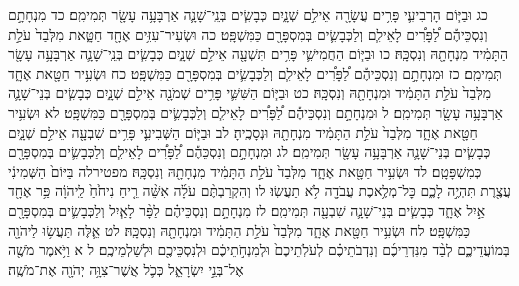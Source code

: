 \documentclass[twoside, openany, parskip=half, 11pt]{book}
\begin{document}
כג וּבַיּ֧וֹם הָרְבִיעִ֛י פָּרִ֥ים עֲשָׂרָ֖ה אֵילִ֣ם שְׁנָ֑יִם כְּבָשִׂ֧ים בְּנֵֽי־שָׁנָ֛ה אַרְבָּעָ֥ה עָשָׂ֖ר תְּמִימִֽם׃ כד מִנְחָתָ֣ם וְנִסְכֵּיהֶ֡ם לַ֠פָּרִ֠ים לָאֵילִ֧ם וְלַכְּבָשִׂ֛ים בְּמִסְפָּרָ֖ם כַּמִּשְׁפָּֽט׃ כה וּשְׂעִיר־עִזִּ֥ים אֶחָ֖ד חַטָּ֑את מִלְּבַד֙ עֹלַ֣ת הַתָּמִ֔יד מִנְחָתָ֖הּ וְנִסְכָּֽהּ׃
כו וּבַיּ֧וֹם הַחֲמִישִׁ֛י פָּרִ֥ים תִּשְׁעָ֖ה אֵילִ֣ם שְׁנָ֑יִם כְּבָשִׂ֧ים בְּנֵֽי־שָׁנָ֛ה אַרְבָּעָ֥ה עָשָׂ֖ר תְּמִימִֽם׃ כז וּמִנְחָתָ֣ם וְנִסְכֵּיהֶ֡ם לַ֠פָּרִ֠ים לָאֵילִ֧ם וְלַכְּבָשִׂ֛ים בְּמִסְפָּרָ֖ם כַּמִּשְׁפָּֽט׃ כח וּשְׂעִ֥יר חַטָּ֖את אֶחָ֑ד מִלְּבַד֙ עֹלַ֣ת הַתָּמִ֔יד וּמִנְחָתָ֖הּ וְנִסְכָּֽהּ׃
כט וּבַיּ֧וֹם הַשִּׁשִּׁ֛י פָּרִ֥ים שְׁמֹנָ֖ה אֵילִ֣ם שְׁנָ֑יִם כְּבָשִׂ֧ים בְּנֵי־שָׁנָ֛ה אַרְבָּעָ֥ה עָשָׂ֖ר תְּמִימִֽם׃ ל וּמִנְחָתָ֣ם וְנִסְכֵּיהֶ֡ם לַ֠פָּרִ֠ים לָאֵילִ֧ם וְלַכְּבָשִׂ֛ים בְּמִסְפָּרָ֖ם כַּמִּשְׁפָּֽט׃ לא וּשְׂעִ֥יר חַטָּ֖את אֶחָ֑ד מִלְּבַד֙ עֹלַ֣ת הַתָּמִ֔יד מִנְחָתָ֖הּ וּנְסָכֶֽיהָ׃
לב וּבַיּ֧וֹם הַשְּׁבִיעִ֛י פָּרִ֥ים שִׁבְעָ֖ה אֵילִ֣ם שְׁנָ֑יִם כְּבָשִׂ֧ים בְּנֵי־שָׁנָ֛ה אַרְבָּעָ֥ה עָשָׂ֖ר תְּמִימִֽם׃ לג וּמִנְחָתָ֣ם וְנִסְכֵּהֶ֡ם לַ֠פָּרִ֠ים לָאֵילִ֧ם וְלַכְּבָשִׂ֛ים בְּמִסְפָּרָ֖ם כְּמִשְׁפָּטָֽם׃ לד וּשְׂעִ֥יר חַטָּ֖את אֶחָ֑ד מִלְּבַד֙ עֹלַ֣ת הַתָּמִ֔יד מִנְחָתָ֖הּ וְנִסְכָּֽהּ׃
מפטירלה בַּיּוֹם֙ הַשְּׁמִינִ֔י עֲצֶ֖רֶת תִּהְיֶ֣ה לָכֶ֑ם כׇּל־מְלֶ֥אכֶת עֲבֹדָ֖ה לֹ֥א תַעֲשֽׂוּ׃ לו וְהִקְרַבְתֶּ֨ם עֹלָ֜ה אִשֵּׁ֨ה רֵ֤יחַ נִיחֹ֙חַ֙ לַֽיהֹוָ֔ה פַּ֥ר אֶחָ֖ד אַ֣יִל אֶחָ֑ד כְּבָשִׂ֧ים בְּנֵי־שָׁנָ֛ה שִׁבְעָ֖ה תְּמִימִֽם׃ לז מִנְחָתָ֣ם וְנִסְכֵּיהֶ֗ם לַפָּ֨ר לָאַ֧יִל וְלַכְּבָשִׂ֛ים בְּמִסְפָּרָ֖ם כַּמִּשְׁפָּֽט׃ לח וּשְׂעִ֥יר חַטָּ֖את אֶחָ֑ד מִלְּבַד֙ עֹלַ֣ת הַתָּמִ֔יד וּמִנְחָתָ֖הּ וְנִסְכָּֽהּ׃ לט אֵ֛לֶּה תַּעֲשׂ֥וּ לַיהֹוָ֖ה בְּמוֹעֲדֵיכֶ֑ם לְבַ֨ד מִנִּדְרֵיכֶ֜ם וְנִדְבֹתֵיכֶ֗ם לְעֹלֹֽתֵיכֶם֙ וּלְמִנְחֹ֣תֵיכֶ֔ם וּלְנִסְכֵּיכֶ֖ם וּלְשַׁלְמֵיכֶֽם׃ ל א וַיֹּ֥אמֶר מֹשֶׁ֖ה אֶל־בְּנֵ֣י יִשְׂרָאֵ֑ל כְּכֹ֛ל אֲשֶׁר־צִוָּ֥ה יְהֹוָ֖ה אֶת־מֹשֶֽׁה׃
\end{document}
